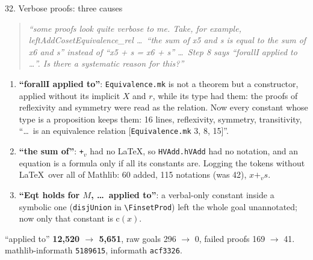 \documentclass[10pt,aspectratio=169]{beamer}
\newcommand{\bad}[1]{\textcolor{warn}{#1}}
\newcommand{\ok}[1]{\textcolor{good}{#1}}
\newcommand{\commit}[1]{\texttt{\footnotesize #1}}
\newcommand{\prompt}[1]{\begin{quote}\small\itshape ``#1''\end{quote}}
\begin{document}
\begin{frame}[fragile]{32. Verbose proofs: three causes}
  \footnotesize
  \prompt{some proofs look quite verbose to me. Take, for example, leftAddCosetEquivalence\_rel
  \ldots\ ``the sum of x5 and s is equal to the sum of x6 and s'' instead of ``x5 + s = x6 + s'' \ldots\
  Step 8 says ``forallI applied to \ldots''. Is there a systematic reason for this?}
  \begin{enumerate}
    \item \textbf{``forallI applied to''}: \texttt{Equivalence.mk} is not a theorem but a
          constructor, applied \bad{without} its implicit $X$ and $r$, while its type had them:
          the proofs of reflexivity and symmetry were read as the relation. Now every constant
          whose type is a proposition keeps them: \ok{16 lines}, reflexivity, symmetry,
          transitivity, ``\ldots\ is an equivalence relation [\texttt{Equivalence.mk} 3, 8, 15]''.
    \item \textbf{``the sum of''}: \texttt{+}$_v$ had no \LaTeX, so \texttt{HVAdd.hVAdd} had no
          notation, and an equation is a formula only if all its constants are. Logging the tokens
          without \LaTeX\ over all of Mathlib: 60 added, \ok{115 notations} (was 42), $x +_v s$.
    \item \textbf{``Eqt holds for $M$, \ldots\ applied to''}: a verbal-only constant inside a
          symbolic one (\texttt{disjUnion} in \texttt{\textbackslash FinsetProd}) left the whole
          goal \bad{unannotated}; now only that constant is $\mathrm{c}(x)$.
  \end{enumerate}
  ``applied to'' \textbf{12,520 $\to$ 5,651}, raw goals 296 $\to$ 0, failed proofs 169 $\to$ 41.
  mathlib-informath \commit{5189615}, informath \commit{acf3326}.
\end{frame}
\end{document}
